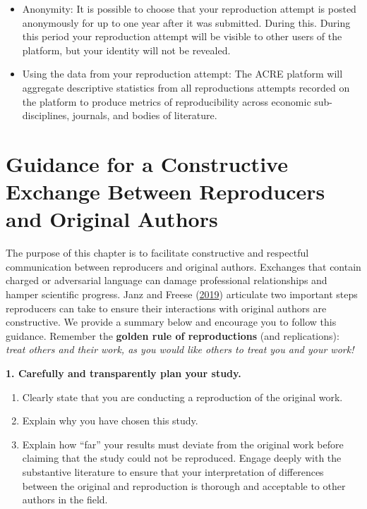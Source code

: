 \documentclass[]{book}
\providecommand{\tightlist}{%
  \setlength{\itemsep}{0pt}\setlength{\parskip}{0pt}}
\begin{document}
\begin{itemize}
\item
  Anonymity: It is possible to choose that your reproduction attempt is posted anonymously for up to one year after it was submitted. During this. During this period your reproduction attempt will be visible to other users of the platform, but your identity will not be revealed.
\item
  Using the data from your reproduction attempt: The ACRE platform will aggregate descriptive statistics from all reproductions attempts recorded on the platform to produce metrics of reproducibility across economic sub-disciplines, journals, and bodies of literature.
\end{itemize}

\hypertarget{guidance-for-a-constructive-exchange-between-reproducers-and-original-authors}{%
\chapter{Guidance for a Constructive Exchange Between Reproducers and Original Authors}\label{guidance-for-a-constructive-exchange-between-reproducers-and-original-authors}}

The purpose of this chapter is to facilitate constructive and respectful communication between reproducers and original authors. Exchanges that contain charged or adversarial language can damage professional relationships and hamper scientific progress. Janz and Freese (\href{https://www.mzes.uni-mannheim.de/openscience/wp-content/uploads/2019/01/Janz-Freese_-Good-and-Bad-Replications-1.pdf}{2019}) articulate two important steps reproducers can take to ensure their interactions with original authors are constructive. We provide a summary below and encourage you to follow this guidance. Remember the \textbf{golden rule of reproductions} (and replications): \emph{treat others and their work, as you would like others to treat you and your work!}

\textbf{1. Carefully and transparently plan your study.}

\begin{enumerate}
\def\labelenumi{\alph{enumi}.}
\tightlist
\item
  Clearly state that you are conducting a reproduction of the original work.\\
\item
  Explain why you have chosen this study.
\item
  Explain how ``far'' your results must deviate from the original work before claiming that the study could not be reproduced. Engage deeply with the substantive literature to ensure that your interpretation of differences between the original and reproduction is thorough and acceptable to other authors in the field.
\end{enumerate}
\end{document}
